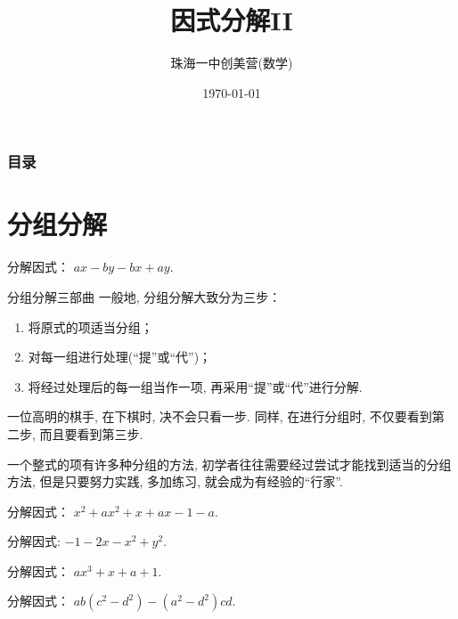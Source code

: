 \documentclass[aspectratio=169]{ctexbeamer}
\title[因式分解II]{因式分解II}
\subtitle{}
\author[珠海一中创美营]{珠海一中创美营(数学)}
\date[\today]{\today}
\theoremstyle{definition}
\begin{document}
\frame{\titlepage}
\begin{frame}
	\frametitle{目录}
	\tableofcontents
\end{frame}

\section{分组分解}
\begin{frame}[t]
	\begin{example}[分组分解三部曲]
		分解因式： $a x-b y-b x+a y .$
	\end{example}
\end{frame}

\begin{frame}{分组分解三部曲}
	一般地, 分组分解大致分为三步：
	\begin{enumerate}
		\item 将原式的项适当分组；
		\item 对每一组进行处理(“提”或“代”)；
		\item 将经过处理后的每一组当作一项, 再采用“提”或“代”进行分解.
	\end{enumerate}
	一位高明的棋手, 在下棋时, 决不会只看一步. 同样, 在进行分组时, 不仅要看到第二步, 而且要看到第三步.

	一个整式的项有许多种分组的方法, 初学者往往需要经过尝试才能找到适当的分组方法, 但是只要努力实践, 多加练习, 就会成为有经验的“行家”.
\end{frame}

\begin{frame}[t]
	\begin{example}[殊途同归]
		分解因式： $x^{2}+a x^{2}+x+a x-1-a$.
	\end{example}
\end{frame}

\begin{frame}[t]
	\begin{example}[瞄准公式]
		分解因式: $-1-2 x-x^{2}+y^{2}$.
	\end{example}
\end{frame}

\begin{frame}[t]
	\begin{example}[瞄准公式]
		分解因式： $a x^{3}+x+a+1$.
	\end{example}
\end{frame}

\begin{frame}[t]
	\begin{example}[从零开始]
		分解因式： $a b\left(c^{2}-d^{2}\right)-\left(a^{2}-d^{2}\right) c d.$
	\end{example}
\end{frame}
\end{document}
